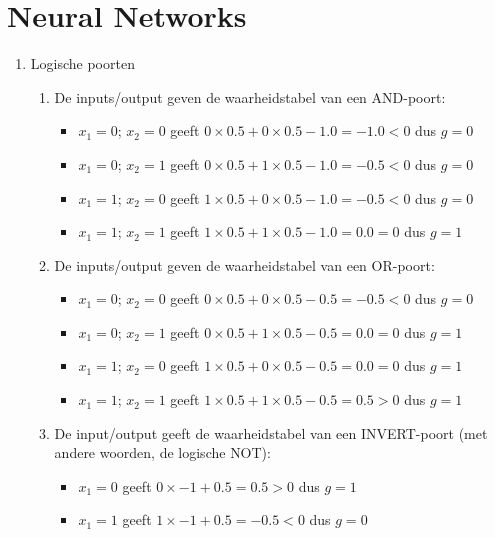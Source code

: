 \section{Neural Networks}

\begin{enumerate}[label=3.\arabic*, itemsep=8pt]
	\item Logische poorten
	\begin{enumerate}[itemsep=8pt]
		\item De inputs/output geven de waarheidstabel van een AND-poort:
		\begin{itemize}
			\item $x_1 = 0$; $x_2 = 0$ geeft $0 \times 0.5 + 0 \times 0.5 - 1.0 = -1.0 < 0$ dus $g = 0$
			\item $x_1 = 0$; $x_2 = 1$ geeft $0 \times 0.5 + 1 \times 0.5 - 1.0 = -0.5 < 0$ dus $g = 0$
			\item $x_1 = 1$; $x_2 = 0$ geeft $1 \times 0.5 + 0 \times 0.5 - 1.0 = -0.5 < 0$ dus $g = 0$
			\item $x_1 = 1$; $x_2 = 1$ geeft $1 \times 0.5 + 1 \times 0.5 - 1.0 = 0.0 = 0$ dus $g = 1$
		\end{itemize}

		\item De inputs/output geven de waarheidstabel van een OR-poort:
		\begin{itemize}
			\item $x_1 = 0$; $x_2 = 0$ geeft $0 \times 0.5 + 0 \times 0.5 - 0.5 = -0.5 < 0$ dus $g = 0$
			\item $x_1 = 0$; $x_2 = 1$ geeft $0 \times 0.5 + 1 \times 0.5 - 0.5 = 0.0 = 0$ dus $g = 1$
			\item $x_1 = 1$; $x_2 = 0$ geeft $1 \times 0.5 + 0 \times 0.5 - 0.5 = 0.0 = 0$ dus $g = 1$
			\item $x_1 = 1$; $x_2 = 1$ geeft $1 \times 0.5 + 1 \times 0.5 - 0.5 = 0.5 > 0$ dus $g = 1$
		\end{itemize}

		\item De input/output geeft de waarheidstabel van een INVERT-poort (met andere woorden, de logische NOT):
		\begin{itemize}
			\item $x_1 = 0$ geeft $0 \times -1 + 0.5 = 0.5 > 0$ dus $g = 1$
			\item $x_1 = 1$ geeft $1 \times -1 + 0.5 = -0.5 < 0$ dus $g = 0$
		\end{itemize}	
	\end{enumerate}



\end{enumerate}
